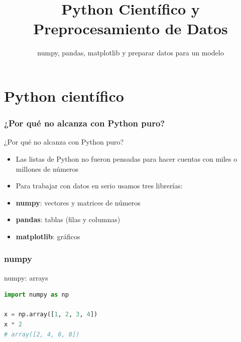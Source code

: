 

\title{Python Científico y Preprocesamiento de Datos}
\subtitle{numpy, pandas, matplotlib y preparar datos para un modelo}
\date{}



\frame{\titlepage}


\part{Python científico}
\frame{\partpage}

\section{¿Por qué no alcanza con Python puro?}

\begin{frame}{¿Por qué no alcanza con Python puro?}
  \begin{itemize}
    \item Las listas de Python no fueron pensadas para hacer cuentas con miles o millones de números
    \item Para trabajar con datos en serio usamos tres librerías:
  \end{itemize}
  \begin{itemize}
    \item \textbf{numpy}: vectores y matrices de números
    \item \textbf{pandas}: tablas (filas y columnas)
    \item \textbf{matplotlib}: gráficos
  \end{itemize}
  \pause
\end{frame}

\section{numpy}

\begin{frame}[fragile]{numpy: arrays}
  \begin{lstlisting}[language=Python]
import numpy as np

x = np.array([1, 2, 3, 4])
x * 2
# array([2, 4, 6, 8])
  \end{lstlisting}
\end{frame}

